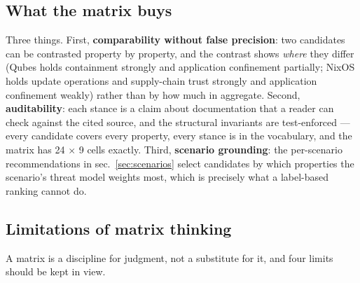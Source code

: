 \documentclass[
  english,
  9pt,
]{extarticle}
\begin{document}
\subsection{What the matrix buys}\label{what-the-matrix-buys}

Three things. First, \textbf{comparability without false precision}: two
candidates can be contrasted property by property, and the contrast
shows \emph{where} they differ (Qubes holds containment strongly and
application confinement partially; NixOS holds update operations and
supply-chain trust strongly and application confinement weakly) rather
than by how much in aggregate. Second, \textbf{auditability}: each
stance is a claim about documentation that a reader can check against
the cited source, and the structural invariants are test-enforced ---
every candidate covers every property, every stance is in the
vocabulary, and the matrix has 24 \texorpdfstring{\ensuremath{\times}}{x} 9 cells exactly. Third,
\textbf{scenario grounding}: the per-scenario recommendations in
sec.~\ref{sec:scenarios} select candidates by which properties the
scenario's threat model weights most, which is precisely what a
label-based ranking cannot do.

\subsection{Limitations of matrix
thinking}\label{limitations-of-matrix-thinking}

A matrix is a discipline for judgment, not a substitute for it, and four
limits should be kept in view.
\end{document}
